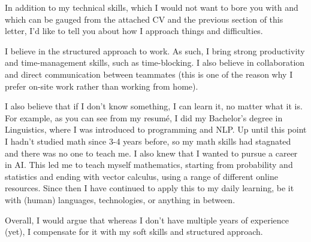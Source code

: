 \documentclass[11pt, a4paper]{awesome-cv}
\begin{document}
\begin{cvletter}
In addition to my technical skills, which I would not want to bore you with and which can be gauged from the attached CV and the previous section of this letter, I'd like to tell you about how I approach things and difficulties.

I believe in the structured approach to work. As such, I bring strong productivity and time-management skills, such as time-blocking. I also believe in collaboration and direct communication between teammates (this is one of the reason why I prefer on-site work rather than working from home).

I also believe that if I don't know something, I can learn it, no matter what it is. For example, as you can see from my resumé, I did my Bachelor's degree in Linguistics, where I was introduced to programming and NLP. Up until this point I hadn't studied math since 3-4 years before, so my math skills had stagnated and there was no one to teach me. I also knew that I wanted to pursue a career in AI. This led me to teach myself mathematics, starting from probability and statistics and ending with vector calculus, using a range of different online resources. Since then I have continued to apply this to my daily learning, be it with (human) languages, technologies, or anything in between.

Overall, I would argue that whereas I don't have multiple years of experience (yet), I compensate for it with my soft skills and structured approach.

\end{cvletter}


\makeletterclosing
\end{document}

